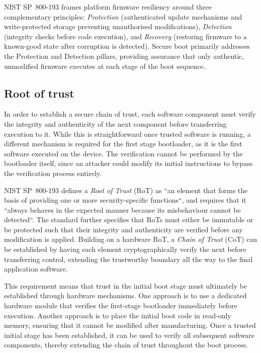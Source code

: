 NIST SP~800-193 \cite{NIST-sp-800-193} frames platform firmware resiliency around three complementary principles: \emph{Protection} (authenticated update mechanisms and write-protected storage preventing unauthorised modifications), \emph{Detection} (integrity checks before code execution), and \emph{Recovery} (restoring firmware to a known-good state after corruption is detected). Secure boot primarily addresses the Protection and Detection pillars, providing assurance that only authentic, unmodified firmware executes at each stage of the boot sequence.

\subsection{Root of trust}
\label{subsection:bg-secureboot-root}

In order to establish a secure chain of trust, each software component must verify the integrity and authenticity of the next component before transferring execution to it. While this is straightforward once trusted software is running, a different mechanism is required for the first stage bootloader, as it is the first software executed on the device. The verification cannot be performed by the bootloader itself, since an attacker could modify its initial instructions to bypass the verification process entirely.

NIST SP~800-193 \cite{NIST-sp-800-193} defines a \emph{Root of Trust} (RoT) as ``an element that forms the basis of providing one or more security-specific functions``, and requires that it ``always behaves in the expected manner because its misbehaviour cannot be detected``. The standard further specifies that RoTs must either be immutable or be protected such that their integrity and authenticity are verified before any modification is applied. Building on a hardware RoT, a \emph{Chain of Trust} (CoT) can be established by having each element cryptographically verify the next before transferring control, extending the trustworthy boundary all the way to the final application software.

This requirement means that trust in the initial boot stage must ultimately be established through hardware mechanisms. One approach is to use a dedicated hardware module that verifies the first-stage bootloader immediately before execution. Another approach is to place the initial boot code in read-only memory, ensuring that it cannot be modified after manufacturing. Once a trusted initial stage has been established, it can be used to verify all subsequent software components, thereby extending the chain of trust throughout the boot process.

